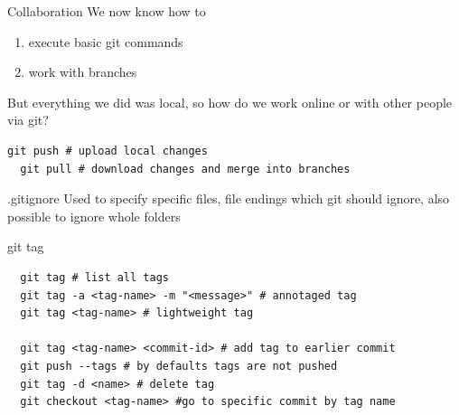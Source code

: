 \documentclass{beamer}
\begin{document}
\begin{frame}[fragile,t]{Collaboration}\vspace{10pt}
  We now know how to 
  \begin{enumerate}
    \item execute basic git commands
    \item work with branches
  \end{enumerate}\vspace{10pt}
  But everything we did was local, so how do we work online or with other people via git?

  \begin{lstlisting}[basicstyle=\ttfamily\tiny]
  git push # upload local changes
  git pull # download changes and merge into branches\end{lstlisting}\vspace{10pt}

\end{frame}



\begin{frame}[fragile,t]{.gitignore}\vspace{10pt}
  Used to specify specific files, file endings which git should ignore, also possible to ignore whole folders
\end{frame}

\begin{frame}[fragile,t]{git tag}\vspace{10pt}
  \begin{lstlisting}
  git tag # list all tags
  git tag -a <tag-name> -m "<message>" # annotaged tag
  git tag <tag-name> # lightweight tag

  git tag <tag-name> <commit-id> # add tag to earlier commit
  git push --tags # by defaults tags are not pushed
  git tag -d <name> # delete tag
  git checkout <tag-name> #go to specific commit by tag name\end{lstlisting}
\end{frame}
\end{document}
